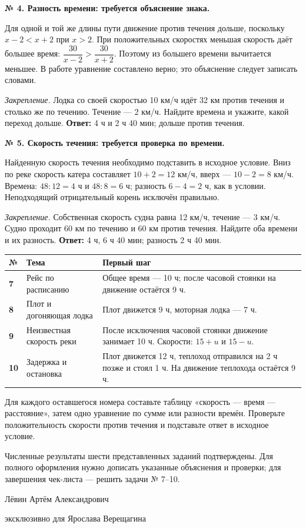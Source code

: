 \documentclass[a4paper,12pt]{article}
\newcommand{\Section}[1]{\vspace{2mm}{\large\bfseries\color{deepaccent}#1}\par\vspace{2mm}}
\newcommand{\Closing}{\vspace{8mm}\begin{center}{\footnotesize\color{deepaccent}Лёвин Артём Александрович\par эксклюзивно для Ярослава Верещагина}\end{center}}
\begin{document}
\medskip
\textbf{№ 4. Разность времени: требуется объяснение знака.}

Для одной и той же длины пути движение против течения дольше, поскольку \(x-2<x+2\) при \(x>2\). При положительных скоростях меньшая скорость даёт большее время: \(\dfrac{30}{x-2}>\dfrac{30}{x+2}\). Поэтому из большего времени вычитается меньшее. В работе уравнение составлено верно; это объяснение следует записать словами.

\textit{Закрепление.} Лодка со своей скоростью 10 км/ч идёт 32 км против течения и столько же по течению. Течение --- 2 км/ч. Найдите времена и укажите, какой переход дольше. \textbf{Ответ:} 4 ч и 2 ч 40 мин; дольше против течения.

\clearpage
\textbf{№ 5. Скорость течения: требуется проверка по времени.}

Найденную скорость течения необходимо подставить в исходное условие. Вниз по реке скорость катера составляет \(10+2=12\) км/ч, вверх --- \(10-2=8\) км/ч. Времена: \(48:12=4\) ч и \(48:8=6\) ч; разность \(6-4=2\) ч, как в условии. Неподходящий отрицательный корень исключён правильно.

\textit{Закрепление.} Собственная скорость судна равна 12 км/ч, течение --- 3 км/ч. Судно проходит 60 км по течению и 60 км против течения. Найдите оба времени и их разность. \textbf{Ответ:} 4 ч, 6 ч 40 мин; разность 2 ч 40 мин.

\Section{Оставшаяся часть чек-листа}
\begin{tabularx}{\linewidth}{@{}>{\bfseries}p{11mm} >{\raggedright\arraybackslash}p{37mm} X@{}}
\toprule
№ & Тема & Первый шаг \\
\midrule
7 & Рейс по расписанию & Общее время --- 10 ч; после часовой стоянки на движение остаётся 9 ч. \\
8 & Плот и догоняющая лодка & Плот движется 9 ч, моторная лодка --- 7 ч. \\
9 & Неизвестная скорость реки & После исключения часовой стоянки движение занимает 10 ч. Скорости: \(15+u\) и \(15-u\). \\
10 & Задержка и остановка & Плот движется 12 ч, теплоход отправился на 2 ч позже и стоял 1 ч. На движение теплохода остаётся 9 ч. \\
\bottomrule
\end{tabularx}

Для каждого оставшегося номера составьте таблицу «скорость --- время --- расстояние», затем одно уравнение по сумме или разности времён. Проверьте положительность скорости против течения и подставьте ответ в исходное условие.

\Section{Итог}
Численные результаты шести представленных заданий подтверждены. Для полного оформления нужно дописать указанные объяснения и проверки; для завершения чек-листа --- решить задачи № 7--10.
\Closing
\end{document}

